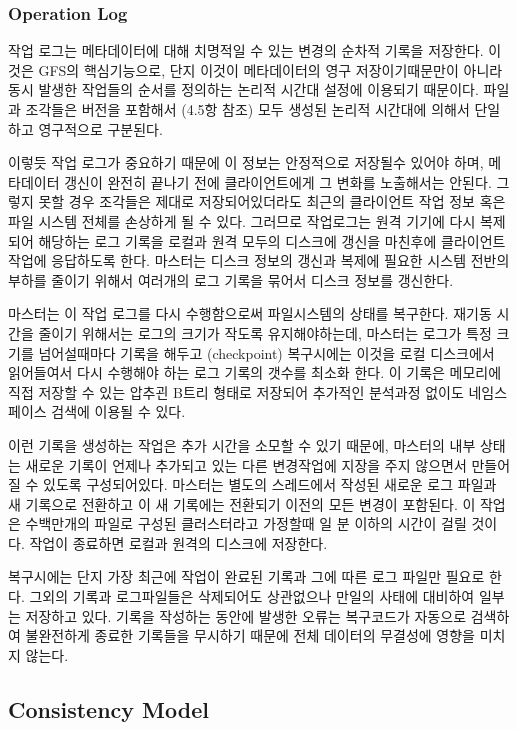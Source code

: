 \documentclass[twocolumn]{article}
\begin{document}
\subsubsection{Operation Log}

 작업 로그는 메타데이터에 대해 치명적일 수 있는 변경의 순차적 기록을 저장한다.  이것은 GFS의 핵심기능으로, 단지 이것이 메타데이터의 영구 저장이기때문만이 아니라 동시 발생한 작업들의 순서를 정의하는 논리적 시간대 설정에 이용되기 때문이다.  파일과 조각들은 버전을 포함해서 (4.5항 참조) 모두 생성된 논리적 시간대에 의해서 단일하고 영구적으로 구분된다.

  이렇듯 작업 로그가 중요하기 때문에 이 정보는 안정적으로 저장될수 있어야 하며, 메타데이터 갱신이 완전히 끝나기 전에 클라이언트에게 그 변화를 노출해서는 안된다.  그렇지 못할 경우 조각들은 제대로 저장되어있더라도 최근의 클라이언트 작업 정보 혹은 파일 시스템 전체를 손상하게 될 수 있다.  그러므로 작업로그는 원격 기기에 다시 복제되어 해당하는 로그 기록을 로컬과 원격 모두의 디스크에 갱신을 마친후에 클라이언트 작업에 응답하도록 한다.  마스터는 디스크 정보의 갱신과 복제에 필요한 시스템 전반의 부하를 줄이기 위해서 여러개의 로그 기록을 묶어서 디스크 정보를 갱신한다.

 마스터는 이 작업 로그를 다시 수행함으로써 파일시스템의 상태를 복구한다.  재기동 시간을 줄이기 위해서는 로그의 크기가 작도록 유지해야하는데, 마스터는 로그가 특정 크기를 넘어설때마다 기록을 해두고 (checkpoint) 복구시에는 이것을 로컬 디스크에서 읽어들여서 다시 수행해야 하는 로그 기록의 갯수를 최소화 한다.  이 기록은 메모리에 직접 저장할 수 있는 압추괸 B트리 형태로 저장되어 추가적인 분석과정 없이도 네임스페이스 검색에 이용될 수 있다.

  이런 기록을 생성하는 작업은 추가 시간을 소모할 수 있기 때문에, 마스터의 내부 상태는 새로운 기록이 언제나 추가되고 있는 다른 변경작업에 지장을 주지 않으면서 만들어 질 수 있도록 구성되어있다.  마스터는 별도의 스레드에서 작성된 새로운 로그 파일과 새 기록으로 전환하고 이 새 기록에는 전환되기 이전의 모든 변경이 포함된다.  이 작업은 수백만개의 파일로 구성된 클러스터라고 가정할때 일 분 이하의 시간이 걸릴 것이다.  작업이 종료하면 로컬과 원격의 디스크에 저장한다.

 복구시에는 단지 가장 최근에 작업이 완료된 기록과 그에 따른 로그 파일만 필요로 한다.  그외의 기록과 로그파일들은 삭제되어도 상관없으나 만일의 사태에 대비하여 일부는 저장하고 있다.  기록을 작성하는 동안에 발생한 오류는 복구코드가 자동으로 검색하여 불완전하게 종료한 기록들을 무시하기 때문에 전체 데이터의 무결성에 영향을 미치지 않는다.

\subsection{Consistency Model}
\end{document}
